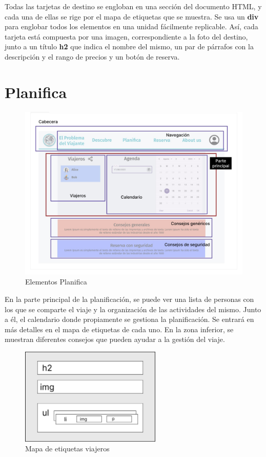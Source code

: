 \documentclass[11pt, a4paper]{book}
\begin{document}
	Todas las tarjetas de destino se engloban en una sección del documento HTML, y cada una de ellas se rige por el mapa de etiquetas que se muestra. Se usa un \textbf{div} para englobar todos los elementos en una unidad fácilmente replicable. Así, cada tarjeta está compuesta por una imagen, correspondiente a la foto del destino, junto a un título \textbf{h2} que indica el nombre del mismo, un par de párrafos con la descripción y el rango de precios y un botón de reserva.

    \section{Planifica}

	\begin{figure} [H]
		\centering
		\includegraphics[width=\textwidth]{HTML/Doc-planifica.jpg}
		\caption{Elementos Planifica}
	\end{figure}

	En la parte principal de la planificación, se puede ver una lista de personas con los que se comparte el viaje y la organización de las actividades del mismo. Junto a él, el calendario donde propiamente se gestiona la planificación. Se entrará en más detalles en el mapa de etiquetas de cada uno. En la zona inferior, se muestran diferentes consejos que pueden ayudar a la gestión del viaje.
	
	\begin{figure} [H]
		\centering
		\includegraphics[width=0.6\textwidth]{HTML/Etiq-viajeros.jpg}
		\caption{Mapa de etiquetas viajeros}
	\end{figure}
\end{document}
